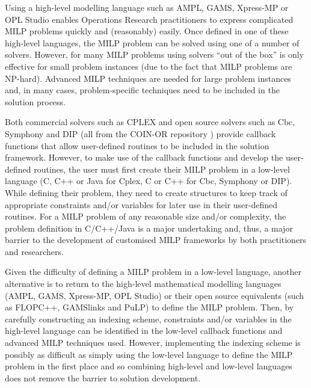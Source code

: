 Using a high-level modelling language such as AMPL, GAMS, Xpress-MP or OPL Studio enables Operations Research practitioners to express complicated \ac{MILP} problems quickly and (reasonably) easily. Once defined in one of these high-level languages, the \ac{MILP} problem can be solved using one of a number of solvers. However, for many \ac{MILP} problems using solvers ``out of the box'' is only effective for small problem instances (due to the fact that \ac{MILP} problems are NP-hard). Advanced \ac{MILP} techniques are needed for large problem instances and, in many cases, problem-specific techniques need to be included in the solution process.

Both commercial solvers such as CPLEX and open source solvers such as Cbc, Symphony and \acs{DIP} (all from the COIN-OR repository \cite{coin_or}) provide callback functions that allow user-defined routines to be included in the solution framework. However, to make use of the callback functions and develop the user-defined routines, the user must first create their \ac{MILP} problem in a low-level language (C, C++ or Java for Cplex, C or C++ for Cbc, Symphony or \acs{DIP}). While defining their problem, they need to create structures to keep track of appropriate constraints and/or variables for later use in their user-defined routines. For a \ac{MILP} problem of any reasonable size and/or complexity, the problem definition in C/C++/Java is a major undertaking and, thus, a major barrier to the development of customised \ac{MILP} frameworks by both practitioners and researchers.

Given the difficulty of defining a \ac{MILP} problem in a low-level language, another alternative is to return to the high-level mathematical modelling languages (AMPL, GAMS, Xpress-MP, OPL Studio) or their open source equivalents (such as FLOPC++, GAMSlinks and PuLP) to define the \ac{MILP} problem. Then, by carefully constructing an indexing scheme, constraints and/or variables in the high-level language can be identified in the low-level callback functions and advanced \ac{MILP} techniques used. However, implementing the indexing scheme is possibly as difficult as simply using the low-level language to define the \ac{MILP} problem in the first place and so combining high-level and low-level languages does not remove the barrier to solution development.

